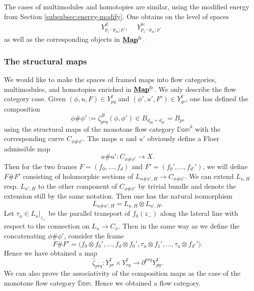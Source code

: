 \documentclass[reqno, 10pt]{amsart}
\numberwithin{equation}{section}
\numberwithin{equation}{section}
\theoremstyle{definition}
\theoremstyle{remark}
\newcommand{\beqn}{\begin{equation*}}
\newcommand{\eeqn}{\end{equation*}}
\newcommand{\mb}{\mathbb}
\newcommand{\uds}[1]{\underline{\smash{#1}}}
\begin{document}
The cases of multimodules and homotopies are similar, using the modified energy from Section \ref{subsubsec:energy-modify}. One obtains on the level of spaces
\begin{align*}
&\ Y_{p_1 \cdots p_m; p'}^{{\mb X}},\ &\ 
Y_{p_1 \cdots p_m; p'}^{{\mb H}}
\end{align*}
as well as the corresponding objects in $\uds{\bf Map}^{\rm fr}$.

\subsubsection{The structural maps}

We would like to make the spaces of framed maps into flow categories, multimodules, and homotopies enriched in $\uds{\bf Map}^{\rm fr}$. We only describe the flow category case. %
Given $(\phi, u, F) \in Y_{pq}^{{\mb F}}$ and $(\phi', u', F') \in Y_{qr}^{{\mb F}}$, one has defined the composition 
\beqn
\phi \# \phi':= \zeta_{prq}^B(\phi, \phi') \in B_{d_{pq} + d_{qr}} = B_{pr}
\eeqn
using the structural maps of the monotone flow category $\mb{Dom}^k$ with the corresponding curve $C_{\phi \# \phi'}$. The maps $u$ and $u'$ obviously define a Floer admissible map
\beqn
u \# u': C_{\phi \# \phi'} \to X.
\eeqn
Then for the two frames $F = (f_0, \ldots, f_d)$ and $F' = (f_0', \ldots, f_{d'}')$, we will define $F\# F'$ consisting of holomorphic sections of $L_{u\# u', H} \to C_{\phi \# \phi'}$. We can extend $L_{u, H}$ resp. $L_{u', H}$ to the other component of $C_{\phi \# \phi'}$ by trivial bundle and denote the extension still by the same notation. Then one has the natural isomorphism
\beqn
L_{u \# u', H} = L_{u, H} \otimes L_{u', H}.
\eeqn
Let $\tau_u \in L_u|_{z_+}$ be the parallel transport of $f_0(z_-)$ along the lateral line with respect to the connection on $L_u \to C_\phi$. Then in the same way as we define the concatenating $\phi \# \phi'$, consider the frame
\beqn
F \# F' = \Big( f_0 \otimes f_0', \ldots, f_d \otimes f_0', \tau_u \otimes f_1', \ldots, \tau_u \otimes f_{d'}' \Big).
\eeqn
Hence we have obtained a map 
\beqn
\hat\zeta_{prq}: Y_{pr}^{\mb F} \times Y_{rq}^{\mb F} \to \partial^{prq} Y_{pq}^{\mb F}.
\eeqn
We can also prove the associativity of the composition maps as the case of the monotone flow category $\mb{Dom}$. Hence we obtained a flow category. 
\end{document}
